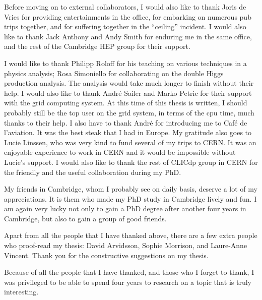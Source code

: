 \begin{acknowledgements}
Before moving on to external collaborators, I would also like to thank Joris de Vries for providing entertainments in the office, for embarking on numerous pub trips together, and for suffering together in the ``ceiling'' incident. I would also like to thank Jack Anthony and Andy Smith for enduring me in the same office, and the rest of the Cambridge HEP group for their support.

I would like to thank Philipp Roloff for his teaching on various techniques in a physics analysis; Rosa Simoniello for collaborating on the double Higgs production analysis. The analysis would take much longer to finish without their help. I would also like to thank Andr\'{e} Sailer and Marko Petric for their support with the \CLIC grid computing system. At this time of this thesis is written, I should probably still be the top user on the grid system, in terms of the cpu time, much thanks to their help. I also have to thank Andr\'{e} for introducing me to Caf\'{e} de l'aviation. It was the best steak that I had in Europe. My gratitude also goes to Lucie Linssen, who was very kind to fund several of my trips to CERN. It was an enjoyable experience to work in CERN and it would be impossible without Lucie's support. I would also like to thank the rest of CLICdp group in CERN for the friendly and the useful collaboration during my PhD.

My friends in Cambridge, whom I probably see on daily basis, deserve a lot of my appreciations. It is them who made my PhD study in Cambridge lively and fun. I am again very lucky not only to gain a PhD degree  after another four years in Cambridge, but also to gain a group of good friends.

Apart from all the people that I have thanked above, there are a few extra people who proof-read my thesis: David Arvidsson, Sophie Morrison, and Laure-Anne Vincent. Thank you for the constructive suggestions on my thesis.

Because of all the people that I have thanked, and those who I forget to thank, I was privileged to be able to spend four years to research on a topic that is truly interesting.


\end{acknowledgements}



